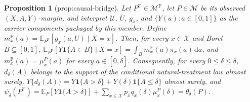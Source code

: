 \documentclass{article}
\newtheorem{proposition}{Proposition}
\begin{document}
\begin{proposition}[prop:causal-bridge]\label{prop:causal-bridge}
Let \(P^{\mathrm F}\in\mathcal M^{\mathrm F}\), let \(P\in\mathcal M\) be its observed \((X,A,Y)\)-margin, and interpret \(\mathcal U\), \(U\), \(g_x\), and \(\{Y(a):a\in[0,1]\}\) as the carrier components packaged by this member.  Define \(m_x^{\mathrm F}(a)=\mathbb E_{P^{\mathrm F}}[g_x(a,U)\mid X=x]\).  Then, for every \(x\in\mathcal X\) and Borel \(B\subseteq[0,1]\), \(\mathbb E_{P^{\mathrm F}}[Y\mathbf 1\{A\in B\}\mid X=x]=\int_Bm_x^{\mathrm F}(a)\pi_x(a)\,\mathrm da\), and \(m_x^{\mathrm F}(a)=\mu_x^P(a)\) for every \(a\in[0,\bar\delta]\).  Consequently, for every \(0\leq\delta\leq\bar\delta\), \(d_\delta(A)\) belongs to the support of the conditional natural-treatment law almost surely, \(Y\{d_\delta(A)\}=Y\mathbf 1\{A>\delta\}+Y(\delta)\mathbf 1\{A\leq\delta\}\) almost surely, and \(\psi_\delta(P^{\mathrm F})=\mathbb E_P[Y\mathbf 1\{A>\delta\}]+\sum_{x\in\mathcal X}p_xq_x(\delta)\mu_x^P(\delta)=\theta_\delta(P)\).
\end{proposition}
\end{document}
